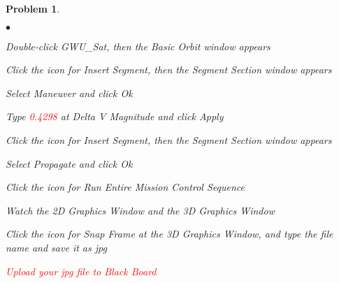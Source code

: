 \documentclass[10pt]{article}
\theoremstyle{plain}\theorembodyfont{\normalfont}
\newtheorem{prob}{Problem}[section]
\begin{document}
\begin{prob}
\begin{list}{$\bullet$}
{\setlength{\itemsep}{-3pt}\setlength{\leftmargin}{30pt}}
\item Double-click \emph{GWU\_Sat}, then the \emph{Basic Orbit} window appears
\item Click the icon for \emph{Insert Segment}, then the \emph{Segment Section} window appears
\item Select \emph{Maneuver} and click \emph{Ok}
\item Type \textcolor{red}{\emph{0.4298}} at \emph{Delta V Magnitude} and click \emph{Apply}
\item Click the icon for \emph{Insert Segment}, then the \emph{Segment Section} window appears
\item Select \emph{Propagate} and click \emph{Ok}
\item Click the icon for \emph{Run Entire Mission Control Sequence}
\item Watch the \emph{2D Graphics Window} and the \emph{3D Graphics Window}
\item Click the icon for \emph{Snap Frame} at the \emph{3D Graphics Window}, and type the file name and save it as jpg
\item \textcolor{red}{Upload your jpg file to Black Board }
\end{list}


\end{prob}
\end{document}
